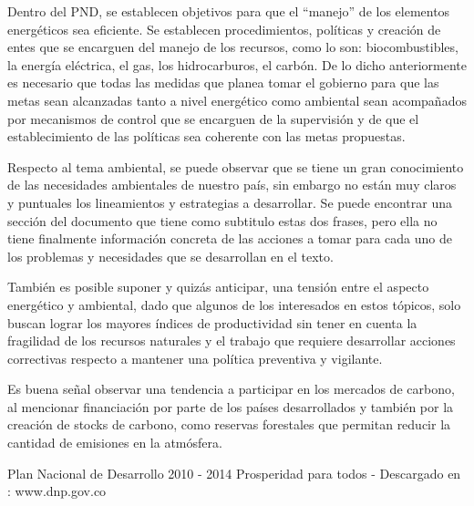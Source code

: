 \documentclass[journal]{./oldtran/IEEEtran}
\begin{document}
Dentro del PND, se establecen objetivos para que el “manejo”  de los elementos energéticos sea eficiente. Se establecen procedimientos, políticas y creación de entes que se encarguen del manejo de los recursos, como lo son: biocombustibles, la energía eléctrica, el gas, los hidrocarburos, el carbón. 
De lo dicho anteriormente es necesario que todas las medidas que planea tomar el gobierno para que las metas sean alcanzadas tanto a nivel energético como ambiental sean acompañados por mecanismos de control que se encarguen de la supervisión y de que el establecimiento de las políticas sea coherente con las metas propuestas.


Respecto al tema ambiental, se puede observar que se tiene un gran conocimiento de las necesidades ambientales de nuestro país, sin embargo no están muy claros y puntuales los lineamientos y estrategias a desarrollar. Se puede encontrar una sección del documento que tiene como subtitulo estas dos frases, pero ella no tiene finalmente información concreta de las acciones a tomar para cada uno de los problemas y necesidades que se desarrollan en el texto.

También es posible suponer y quizás anticipar, una tensión entre el aspecto energético y ambiental, dado que algunos de los interesados en estos tópicos, solo buscan lograr los mayores índices de productividad sin tener en cuenta la fragilidad de los recursos naturales y el trabajo que requiere desarrollar acciones correctivas respecto a mantener una política preventiva y vigilante.


Es buena señal observar una tendencia a participar en los mercados de carbono, al mencionar financiación por parte de los países desarrollados y también por la creación de stocks de carbono, como reservas forestales que permitan reducir la cantidad de emisiones en la atmósfera.


\begin{thebibliography}{1}
 Plan Nacional de Desarrollo 2010 - 2014 Prosperidad para todos -  Descargado en : www.dnp.gov.co
\end{thebibliography}
\end{document}
